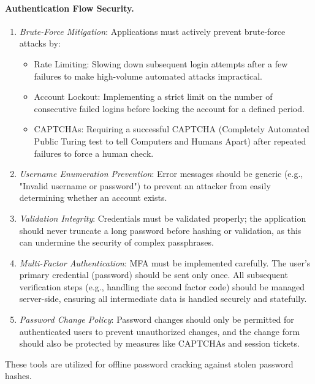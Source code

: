 \paragraph{Authentication Flow Security.}
\begin{enumerate}
    \item \textit{Brute-Force Mitigation}: Applications must actively prevent brute-force attacks by:
          \begin{itemize}
              \item Rate Limiting: Slowing down subsequent login attempts after a few failures to make high-volume automated attacks impractical.
              \item Account Lockout: Implementing a strict limit on the number of consecutive failed logins before locking the account for a defined period.
              \item CAPTCHAs: Requiring a successful CAPTCHA (Completely Automated Public Turing test to tell Computers and Humans Apart) after repeated failures to force a human check.
          \end{itemize}

    \item \textit{Username Enumeration Prevention}: Error messages should be generic (e.g., "Invalid username or password") to prevent an attacker from easily determining whether an account exists.
    \item \textit{Validation Integrity}: Credentials must be validated properly; the application should never truncate a long password before hashing or validation, as this can undermine the security of complex passphrases.
    \item \textit{Multi-Factor Authentication}: MFA must be implemented carefully. The user's primary credential (password) should be sent only once. All subsequent verification steps (e.g., handling the second factor code) should be managed server-side, ensuring all intermediate data is handled securely and statefully.
    \item \textit{Password Change Policy}: Password changes should only be permitted for authenticated users to prevent unauthorized changes, and the change form should also be protected by measures like CAPTCHAs and session tickets.
\end{enumerate}

These tools are utilized for offline password cracking against stolen password hashes.

